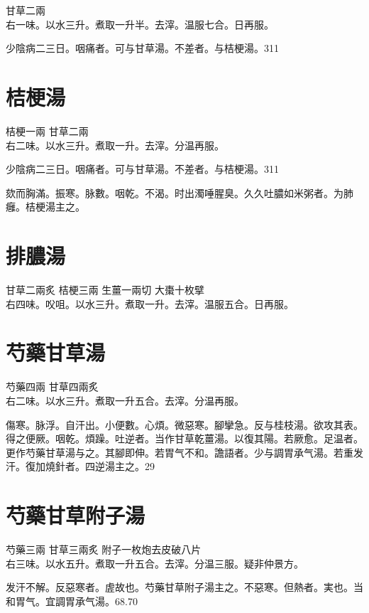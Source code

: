甘草{\scriptsize 二兩}\\
右一味。以水三升。煮取一升半。去滓。温服七合。日再服。

少陰病二三日。咽痛者。可与甘草湯。不差者。与桔梗湯。311

\section{桔梗湯}

桔梗{\scriptsize 一兩} 甘草{\scriptsize 二兩}\\
右二味。以水三升。煮取一升。去滓。分温再服。

少陰病二三日。咽痛者。可与甘草湯。不差者。与桔梗湯。311

欬而胸滿。振寒。脉數。咽乾。不渴。时出濁唾腥臭。久久吐膿如米粥者。为肺癰。桔梗湯主之。

\section{排膿湯}

甘草{\scriptsize 二兩炙} 桔梗{\scriptsize 三兩} 生薑{\scriptsize 一兩切} 大棗{\scriptsize 十枚擘}\\
右四味。㕮咀。以水三升。煮取一升。去滓。温服五合。日再服。

\section{芍藥甘草湯}

芍藥{\scriptsize 四兩} 甘草{\scriptsize 四兩炙}\\
右二味。以水三升。煮取一升五合。去滓。分温再服。

傷寒。脉浮。自汗出。小便數。心煩。微惡寒。腳攣急。反与桂枝湯。欲攻其表。得之便厥。咽乾。煩躁。吐逆者。当作甘草乾薑湯。以復其陽。若厥愈。足温者。更作芍藥甘草湯与之。其腳即伸。若胃气不和。譫語者。少与{\khaaitp 調胃}承气湯。若重发汗。復加燒針者。四逆湯主之。29

\section{芍藥甘草附子湯}

芍藥{\scriptsize 三兩} 甘草{\scriptsize 三兩炙} 附子{\scriptsize 一枚炮去皮破八片}\\
右三味。以水五升。煮取一升五合。去滓。分温三服。疑非仲景方。

发汗不解。反惡寒者。虗故也。芍藥甘草附子湯主之。不惡寒。但熱者。実也。当和胃气。宜調胃承气湯。68.70

